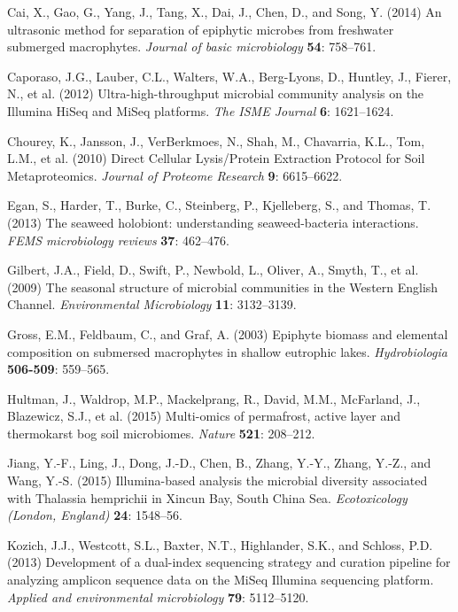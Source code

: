 \documentclass[12pt,]{article}
\begin{document}
\leavevmode\hypertarget{ref-Cai2014}{}%
Cai, X., Gao, G., Yang, J., Tang, X., Dai, J., Chen, D., and Song, Y.
(2014) An ultrasonic method for separation of epiphytic microbes from
freshwater submerged macrophytes. \emph{Journal of basic microbiology}
\textbf{54}: 758--761.

\leavevmode\hypertarget{ref-Caporaso2012}{}%
Caporaso, J.G., Lauber, C.L., Walters, W.A., Berg-Lyons, D., Huntley,
J., Fierer, N., et al. (2012) Ultra-high-throughput microbial community
analysis on the Illumina HiSeq and MiSeq platforms. \emph{The ISME
Journal} \textbf{6}: 1621--1624.

\leavevmode\hypertarget{ref-Chourey2010}{}%
Chourey, K., Jansson, J., VerBerkmoes, N., Shah, M., Chavarria, K.L.,
Tom, L.M., et al. (2010) Direct Cellular Lysis/Protein Extraction
Protocol for Soil Metaproteomics. \emph{Journal of Proteome Research}
\textbf{9}: 6615--6622.

\leavevmode\hypertarget{ref-Egan2013}{}%
Egan, S., Harder, T., Burke, C., Steinberg, P., Kjelleberg, S., and
Thomas, T. (2013) The seaweed holobiont: understanding seaweed-bacteria
interactions. \emph{FEMS microbiology reviews} \textbf{37}: 462--476.

\leavevmode\hypertarget{ref-Gilbert2009}{}%
Gilbert, J.A., Field, D., Swift, P., Newbold, L., Oliver, A., Smyth, T.,
et al. (2009) The seasonal structure of microbial communities in the
Western English Channel. \emph{Environmental Microbiology} \textbf{11}:
3132--3139.

\leavevmode\hypertarget{ref-Gross2003}{}%
Gross, E.M., Feldbaum, C., and Graf, A. (2003) Epiphyte biomass and
elemental composition on submersed macrophytes in shallow eutrophic
lakes. \emph{Hydrobiologia} \textbf{506-509}: 559--565.

\leavevmode\hypertarget{ref-Hultman2015}{}%
Hultman, J., Waldrop, M.P., Mackelprang, R., David, M.M., McFarland, J.,
Blazewicz, S.J., et al. (2015) Multi-omics of permafrost, active layer
and thermokarst bog soil microbiomes. \emph{Nature} \textbf{521}:
208--212.

\leavevmode\hypertarget{ref-Jiang2015}{}%
Jiang, Y.-F., Ling, J., Dong, J.-D., Chen, B., Zhang, Y.-Y., Zhang,
Y.-Z., and Wang, Y.-S. (2015) Illumina-based analysis the microbial
diversity associated with Thalassia hemprichii in Xincun Bay, South
China Sea. \emph{Ecotoxicology (London, England)} \textbf{24}: 1548--56.

\leavevmode\hypertarget{ref-Kozich2013}{}%
Kozich, J.J., Westcott, S.L., Baxter, N.T., Highlander, S.K., and
Schloss, P.D. (2013) Development of a dual-index sequencing strategy and
curation pipeline for analyzing amplicon sequence data on the MiSeq
Illumina sequencing platform. \emph{Applied and environmental
microbiology} \textbf{79}: 5112--5120.
\end{document}
